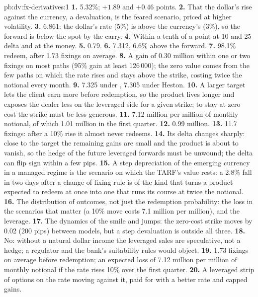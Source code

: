 \begin{solution}{pb:dv:fx-derivatives:1}
\textbf{1.} 5.32\%; $+1.89$ and $+0.46$ points.
\textbf{2.} That the dollar's rise against the currency, a devaluation, is the feared scenario, priced at higher volatility.
\textbf{3.} 6.861: the dollar's rate (5\%) is above the currency's (3\%), so the forward is below the spot by the carry.
\textbf{4.} Within a tenth of a point at 10 and 25 delta and at the money.
\textbf{5.} 0.79.
\textbf{6.} 7.312, 6.6\% above the forward.
\textbf{7.} 98.1\% redeem, after 1.73 fixings on average.
\textbf{8.} A gain of 0.30 million within one or two fixings on most paths (95\% gain at least 126\,000); the zero value comes from the few paths on which the
rate rises and stays above the strike, costing twice the notional every month.
\textbf{9.} 7.325 under , 7.305 under Heston.
\textbf{10.} A larger target lets the client earn more before redemption, so the product lives longer and exposes the dealer less on the leveraged side for a
given strike; to stay at zero cost the strike must be less generous.
\textbf{11.} 7.12 million per million of monthly notional, of which 1.01 million in the first quarter.
\textbf{12.} 0.99 million.
\textbf{13.} 11.7 fixings: after a 10\% rise it almost never redeems.
\textbf{14.} Its delta changes sharply: close to the target the remaining gains are small and the product is about to vanish, so the hedge of the future
leveraged forwards must be unwound; the delta can flip sign within a few pips.
\textbf{15.} A step depreciation of the emerging currency in a managed regime is the scenario on which the TARF's value rests: a 2.8\% fall in two days after a
change of fixing rule is of the kind that turns a product expected to redeem at once into one that runs its course at twice the notional.
\textbf{16.} The distribution of outcomes, not just the redemption probability: the loss in the scenarios that matter (a 10\% move costs 7.1 million per
million), and the leverage.
\textbf{17.} The dynamics of the smile and jumps: the zero-cost strike moves by 0.02 (200 pips) between models, but a step devaluation is outside all three.
\textbf{18.} No: without a natural dollar income the leveraged sales are speculative, not a hedge; a regulator and the bank's suitability rules would object.
\textbf{19.} 1.73 fixings on average before redemption; an expected loss of 7.12 million per million of monthly notional if the rate rises 10\% over the first
quarter.
\textbf{20.} A leveraged strip of options on the rate moving against it, paid for with a better rate and capped gains.
\end{solution}

